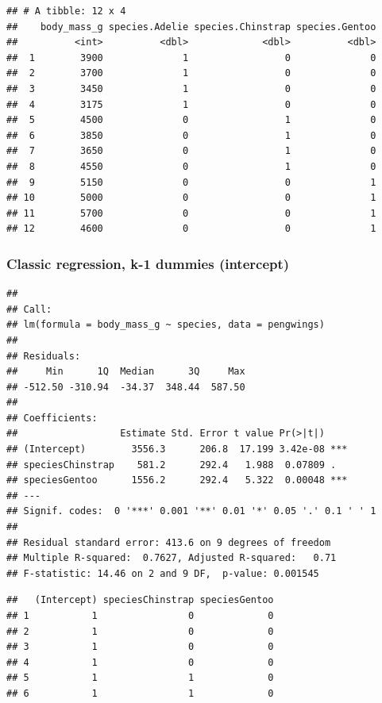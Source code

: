 \documentclass[
  openany]{book}
\begin{document}
\begin{verbatim}
## # A tibble: 12 x 4
##    body_mass_g species.Adelie species.Chinstrap species.Gentoo
##          <int>          <dbl>             <dbl>          <dbl>
##  1        3900              1                 0              0
##  2        3700              1                 0              0
##  3        3450              1                 0              0
##  4        3175              1                 0              0
##  5        4500              0                 1              0
##  6        3850              0                 1              0
##  7        3650              0                 1              0
##  8        4550              0                 1              0
##  9        5150              0                 0              1
## 10        5000              0                 0              1
## 11        5700              0                 0              1
## 12        4600              0                 0              1
\end{verbatim}

\hypertarget{classic-regression-k-1-dummies-intercept}{%
\subsubsection{Classic regression, k-1 dummies (intercept)}\label{classic-regression-k-1-dummies-intercept}}

\begin{verbatim}
## 
## Call:
## lm(formula = body_mass_g ~ species, data = pengwings)
## 
## Residuals:
##     Min      1Q  Median      3Q     Max 
## -512.50 -310.94  -34.37  348.44  587.50 
## 
## Coefficients:
##                  Estimate Std. Error t value Pr(>|t|)    
## (Intercept)        3556.3      206.8  17.199 3.42e-08 ***
## speciesChinstrap    581.2      292.4   1.988  0.07809 .  
## speciesGentoo      1556.2      292.4   5.322  0.00048 ***
## ---
## Signif. codes:  0 '***' 0.001 '**' 0.01 '*' 0.05 '.' 0.1 ' ' 1
## 
## Residual standard error: 413.6 on 9 degrees of freedom
## Multiple R-squared:  0.7627, Adjusted R-squared:   0.71 
## F-statistic: 14.46 on 2 and 9 DF,  p-value: 0.001545
\end{verbatim}

\begin{verbatim}
##   (Intercept) speciesChinstrap speciesGentoo
## 1           1                0             0
## 2           1                0             0
## 3           1                0             0
## 4           1                0             0
## 5           1                1             0
## 6           1                1             0
\end{verbatim}
\end{document}
